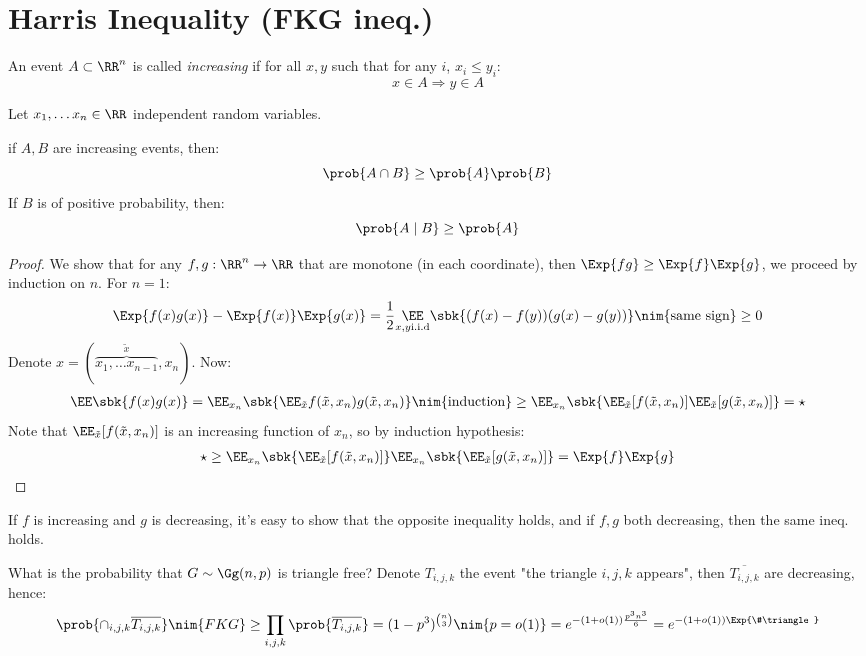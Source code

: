 \documentclass[a4paper, 11pt, oneside]{book}
\begin{document}
\section{Harris Inequality (FKG ineq.)}
\begin{yellowBox}
\begin{defn}
	An event $A\subset \RR^n$ is called \emph{increasing} if for all $x,y$ such that for any $i$, $x_i\le y_i$:
	\[
	x\in A\Rightarrow y\in A
	\]
\end{defn}	
\end{yellowBox}
Let $x_1,\ldots x_n\in \RR$ independent random variables.
\begin{thm}
	 \label{thm: Harris} if $A,B$ are increasing events, then:
	\[
	\prob{A\cap B}\ge \prob{A}\prob{B}
	\]
	If $B$ is of positive probability, then:
	\[
	\prob{A\mid B}\ge \prob{A}
	\]
\end{thm}
\begin{proof}
	We show that for any $f,g:\RR^n\to \RR$ that are monotone (in each coordinate), then $\Exp{fg}\ge \Exp{f}\Exp{g}$, we proceed by induction on $n$. For $n=1$:
	\begin{align*}
		\Exp{f(x)g(x)}-\Exp{f(x)}\Exp{g(x)} = \frac12\underset{x,y\text{i.i.d}}{\EE}\sbk{(f(x)-f(y))(g(x)-g(y))}\nim{\text{same sign}}\ge 0
	\end{align*}
	Denote $x = (\overbrace{x_1,\ldots x_{n-1}}^{\tilde{x}},x_n)$. Now:
	\begin{align*}
		\EE\sbk{f(x)g(x)} = \EE_{x_n}\sbk{\EE_{\tilde{x}}f(\tilde{x},x_n)g(\tilde{x},x_n)}\nim{\text{induction}}\ge \EE_{x_n}\sbk{\EE_{\tilde{x}}[f(\tilde{x},x_n)]\EE_{\tilde{x}}[g(\tilde{x},x_n)]}= \star
	\end{align*}
	Note that $\EE_{\tilde{x}}[f(\tilde{x},x_n)]$ is an increasing function of $x_n$, so by induction hypothesis:
	\begin{align*}
		\star \ge \EE_{x_n}\sbk{\EE_{\tilde{x}}[f(\tilde{x},x_n)]}\EE_{x_n}\sbk{\EE_{\tilde{x}}[g(\tilde{x},x_n)]} = \Exp{f}\Exp{g}
	\end{align*}
\end{proof}
\begin{remark}
	If $f$ is increasing and $g$ is decreasing, it's easy to show that the opposite inequality holds, and if $f,g$ both decreasing, then the same ineq. holds.
\end{remark}
\begin{example}
	What is the probability that $G\sim \Gg(n,p)$ is triangle free? Denote $T_{i,j,k}$ the event "the triangle $i,j,k$ appears", then $\overline{T_{i,j,k}}$ are decreasing, hence:
	\begin{align*}
		\prob{\cap_{i,j,k}\overline{T_{i,j,k}}} \nim{FKG}\ge \prod_{i,j,k}\prob{\overline{T_{i,j,k}}} = (1-p^3)^{n\choose 3}\nim{p=o(1)}=e^{-(1+o(1))\frac{p^3n^3}{6}} = e^{-(1+o(1))\Exp{\#\triangle}}
	\end{align*}
\end{example}
\end{document}
